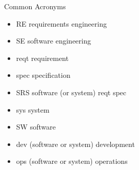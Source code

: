 
\begin{Slide}{Common Acronyms}

\begin{itemize}
\item RE   \hfill requirements engineering
\item SE   \hfill software engineering
\item reqt \hfill requirement 
\item spec \hfill specification
\item SRS  \hfill software (or system) reqt spec
\item sys  \hfill system
\item SW   \hfill software
\item dev  \hfill (software or system) development
\item ops  \hfill (software or system) operations


\end{itemize}
\end{Slide}